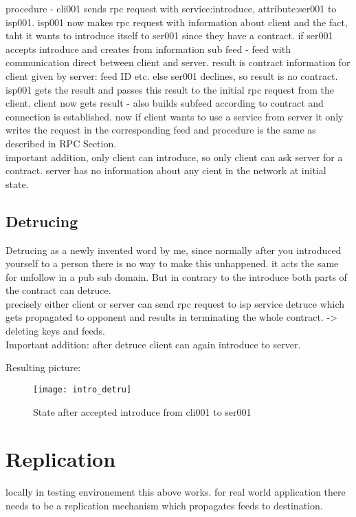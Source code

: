 procedure - cli001 sends rpc request with service:introduce, attribute:ser001 to isp001.
isp001 now makes rpc request with information about client and the fact, taht it wants to introduce itself to ser001 since they have a contract. 
if ser001 accepts introduce and creates from information sub feed - feed with communication direct between client and server.
result is contract information for client given by server: feed ID etc.
else ser001 declines, so result is no contract.
isp001 gets the result and passes this result to the initial rpc request from the client. client now gets result - also builds subfeed according to contract and connection is established. now if client wants to use a service from server it only writes the request in the corresponding feed and procedure is the same as described in RPC Section.
\\
important addition, only client can introduce, so only client can ask server for a contract. server has no information about any cient in the network at initial state.
\subsection{Detrucing}
Detrucing as a newly invented word by me, since normally after you introduced yourself to a person there is no way to make this unhappened. it acts the same for unfollow in a pub sub domain. But in contrary to the introduce both parts of the contract can detruce. \\
precisely either client or server can send rpc request to isp service detruce which gets propagated to opponent and results in terminating the whole contract. -> deleting keys and feeds.
\\
Important addition: after detruce client can again introduce to server.

Resulting picture:
\begin{figure}
    \centering
    \texttt{[image: intro\_detru]}
    \caption{State after accepted introduce from cli001 to ser001}
    \label{fig:contract_cli_isp}
\end{figure}

\pagebreak
\section{Replication}
locally in testing environement this above works. for real world application there needs to be a replication mechanism which propagates feeds to destination.

